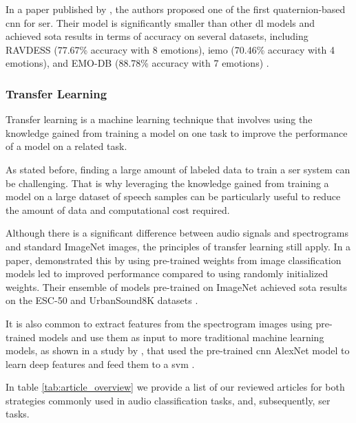 In a paper published by \citeauthor{Muppidi2021}, the authors proposed one of the first quaternion-based \ac{cnn} for \ac{ser}. Their model is significantly smaller than other \ac{dl} models and achieved \ac{sota} results in terms of accuracy on several datasets, including RAVDESS (77.67\% accuracy with 8 emotions), \ac{iemo} (70.46\% accuracy with 4 emotions), and EMO-DB (88.78\% accuracy with 7 emotions) \cite{Muppidi2021}.


\subsubsection{Transfer Learning}

Transfer learning is a machine learning technique that involves using the knowledge gained from training a model on one task to improve the performance of a model on a related task.

As stated before, finding a large amount of labeled data to train a \ac{ser} system can be challenging. That is why leveraging the knowledge gained from training a model on a large dataset of speech samples can be particularly useful to reduce the amount of data and computational cost required.

Although there is a significant difference between audio signals and spectrograms and standard ImageNet images, the principles of transfer learning still apply. In a \citeyear{rethinkPalanisamy} paper, \citeauthor{rethinkPalanisamy} demonstrated this by using pre-trained weights from image classification models led to improved performance compared to using randomly initialized weights. Their ensemble of models pre-trained on ImageNet achieved \ac{sota} results on the ESC-50 and UrbanSound8K datasets \cite{rethinkPalanisamy}.

It is also common to extract features from the spectrogram images using pre-trained models and use them as input to more traditional machine learning models, as shown in a study by \citeauthor{8085174}, that used the pre-trained \ac{cnn} AlexNet model to learn deep features and feed them to a \ac{svm} \cite{8085174}.

In table \ref{tab:article_overview} we provide a list of our reviewed articles for both strategies commonly used in audio classification tasks, and, subsequently, \ac{ser} tasks.

